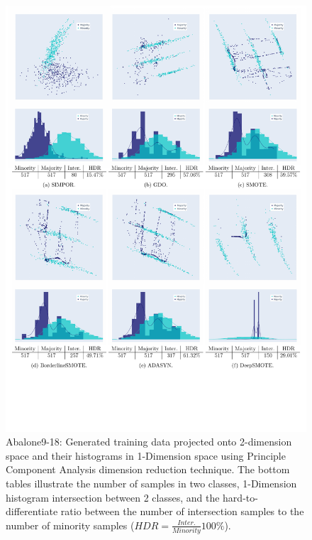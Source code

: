 \begin{figure}[h!]
	\centering
	\includegraphics[width=0.8\linewidth,trim=10 90 10 10, clip ]{Figures/PCA/abalone9-18}
	\caption{Abalone9-18: Generated training data projected onto 2-dimension space and their histograms in 1-Dimension space using Principle Component Analysis dimension reduction technique. The bottom tables illustrate the number of samples in two classes, 1-Dimension histogram intersection between 2 classes, and the hard-to-differentiate ratio between the number of intersection samples to the number of minority samples ($HDR = \frac{Inter.}{Minority}100\%$).}
	\label{fig:visualization1d2d}
\end{figure}
